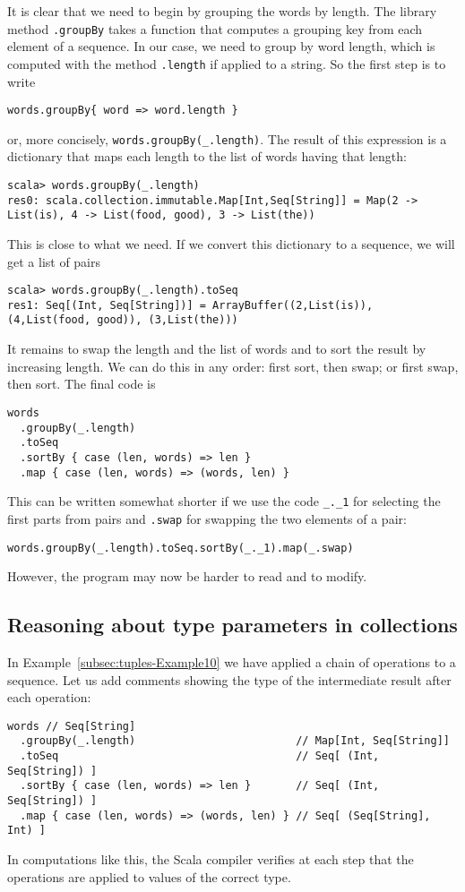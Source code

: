 It is clear that we need to begin by grouping the words by length.
The library method \lstinline!.groupBy! takes a function that computes
a grouping key from each element of a sequence. In our case, we need
to group by word length, which is computed with the method \lstinline!.length!
if applied to a string. So the first step is to write
\begin{lstlisting}
words.groupBy{ word => word.length }
\end{lstlisting}
or, more concisely, \lstinline!words.groupBy(_.length)!. The result
of this expression is a dictionary that maps each length to the list
of words having that length:
\begin{lstlisting}
scala> words.groupBy(_.length)
res0: scala.collection.immutable.Map[Int,Seq[String]] = Map(2 -> List(is), 4 -> List(food, good), 3 -> List(the))
\end{lstlisting}
This is close to what we need. If we convert this dictionary to a
sequence, we will get a list of pairs
\begin{lstlisting}
scala> words.groupBy(_.length).toSeq
res1: Seq[(Int, Seq[String])] = ArrayBuffer((2,List(is)), (4,List(food, good)), (3,List(the))) 
\end{lstlisting}
It remains to swap the length and the list of words and to sort the
result by increasing length. We can do this in any order: first sort,
then swap; or first swap, then sort. The final code is
\begin{lstlisting}
words
  .groupBy(_.length)
  .toSeq
  .sortBy { case (len, words) => len }
  .map { case (len, words) => (words, len) }
\end{lstlisting}
This can be written somewhat shorter if we use the code \lstinline!_._1!
for selecting the first parts from pairs and \lstinline!.swap! for
swapping the two elements of a pair:
\begin{lstlisting}
words.groupBy(_.length).toSeq.sortBy(_._1).map(_.swap)
\end{lstlisting}
However, the program may now be harder to read and to modify.

\subsection{Reasoning about type parameters in collections}

In Example~\ref{subsec:tuples-Example10} we have applied a chain
of operations to a sequence. Let us add comments showing the type
of the intermediate result after each operation:
\begin{lstlisting}
words // Seq[String]
  .groupBy(_.length)                         // Map[Int, Seq[String]]
  .toSeq                                     // Seq[ (Int, Seq[String]) ]
  .sortBy { case (len, words) => len }       // Seq[ (Int, Seq[String]) ]
  .map { case (len, words) => (words, len) } // Seq[ (Seq[String], Int) ]
\end{lstlisting}
In computations like this, the Scala compiler verifies at each step
that the operations are applied to values of the correct type.

